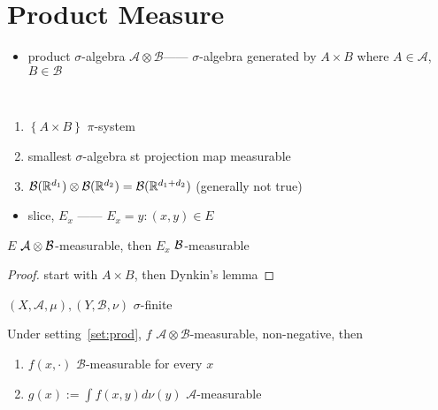 \section{Product Measure}\label{sec:product-measure}

\begin{itemize}
    \item product $\sigma$-algebra $\mathcal{A} \otimes \mathcal{B}$------ $\sigma$-algebra generated by $A \times B$ where $A \in \mathcal{A}$, $B \in \mathcal{B}$
\end{itemize}

\begin{fact}
    \,
    \begin{enumerate}
        \item $\left\{ A \times B \right\}$ $\pi$-system
        \item smallest $\sigma$-algebra st projection map measurable
        \item $\mathcal{B}(\mathbb{R}^{d_1}) \otimes \mathcal{B}(\mathbb{R}^{d_2}) = \mathcal{B}(\mathbb{R}^{d_1 + d_2})$ (generally not true)
    \end{enumerate}
\end{fact}

\begin{itemize}
    \item slice, $E_x$ ------ $E_x = {y : (x, y) \in E}$
\end{itemize}

\begin{lemma}
    $E$ $\mathcal{A} \otimes \mathcal{B}$-measurable, then $E_x$ $\mathcal{B}$-measurable
\end{lemma}
\begin{proof}
    start with $A \times B$, then Dynkin's lemma
\end{proof}

\begin{setting} \label{set:prod}
    $(X, \mathcal{A}, \mu), (Y, \mathcal{B}, \nu)$ $\sigma$-finite
\end{setting}

\begin{lemma}
     Under setting~\ref{set:prod}, $f$ $\mathcal{A} \otimes \mathcal{B}$-measurable, non-negative, then
    \begin{enumerate}
        \item $f(x, \cdot)$ $\mathcal{B}$-measurable for every $x$
        \item $g(x) := \int f(x, y) d\nu(y)$ $\mathcal{A}$-measurable
    \end{enumerate}
\end{lemma}

